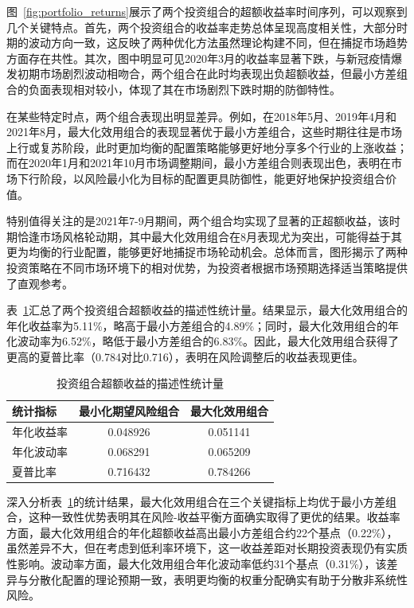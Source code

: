 \documentclass[12pt, a4paper]{article}
\begin{document}
图~\ref{fig:portfolio_returns}展示了两个投资组合的超额收益率时间序列，可以观察到几个关键特点。首先，两个投资组合的收益率走势总体呈现高度相关性，大部分时期的波动方向一致，这反映了两种优化方法虽然理论构建不同，但在捕捉市场趋势方面存在共性。其次，图中明显可见2020年3月的收益率显著下跌，与新冠疫情爆发初期市场剧烈波动相吻合，两个组合在此时均表现出负超额收益，但最小方差组合的负面表现相对较小，体现了其在市场剧烈下跌时期的防御特性。

在某些特定时点，两个组合表现出明显差异。例如，在2018年5月、2019年4月和2021年8月，最大化效用组合的表现显著优于最小方差组合，这些时期往往是市场上行或复苏阶段，此时更加均衡的配置策略能够更好地分享多个行业的上涨收益；而在2020年1月和2021年10月市场调整期间，最小方差组合则表现出色，表明在市场下行阶段，以风险最小化为目标的配置更具防御性，能更好地保护投资组合价值。

特别值得关注的是2021年7-9月期间，两个组合均实现了显著的正超额收益，该时期恰逢市场风格轮动期，其中最大化效用组合在8月表现尤为突出，可能得益于其更为均衡的行业配置，能够更好地捕捉市场轮动机会。总体而言，图形揭示了两种投资策略在不同市场环境下的相对优势，为投资者根据市场预期选择适当策略提供了直观参考。

表~\ref{tab:portfolio_stats}汇总了两个投资组合超额收益的描述性统计量。结果显示，最大化效用组合的年化收益率为5.11\%，略高于最小方差组合的4.89\%；同时，最大化效用组合的年化波动率为6.52\%，略低于最小方差组合的6.83\%。因此，最大化效用组合获得了更高的夏普比率（0.784对比0.716），表明在风险调整后的收益表现更佳。

\begin{table}[htbp]
\centering
\caption{投资组合超额收益的描述性统计量}
\label{tab:portfolio_stats}
\begin{tabular}{lcc}
\toprule
\textbf{统计指标} & \textbf{最小化期望风险组合} & \textbf{最大化效用组合} \\
\midrule
年化收益率 & 0.048926 & 0.051141 \\
年化波动率 & 0.068291 & 0.065209 \\
夏普比率 & 0.716432 & 0.784266 \\
\bottomrule
\end{tabular}
\end{table}

深入分析表~\ref{tab:portfolio_stats}的统计结果，最大化效用组合在三个关键指标上均优于最小方差组合，这种一致性优势表明其在风险-收益平衡方面确实取得了更优的结果。收益率方面，最大化效用组合的年化超额收益高出最小方差组合约22个基点（0.22\%），虽然差异不大，但在考虑到低利率环境下，这一收益差距对长期投资表现仍有实质性影响。波动率方面，最大化效用组合年化波动率低约31个基点（0.31\%），该差异与分散化配置的理论预期一致，表明更均衡的权重分配确实有助于分散非系统性风险。
\end{document}

